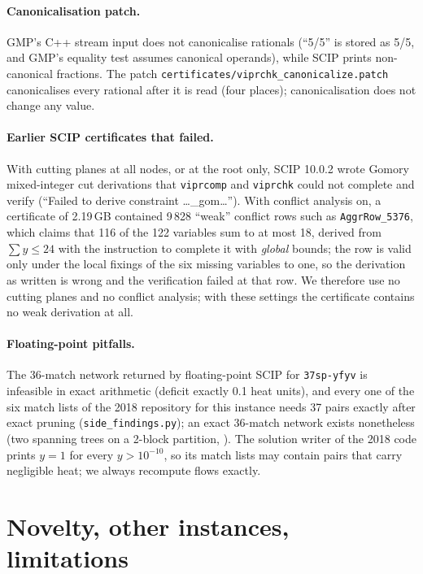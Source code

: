 \documentclass[11pt,a4paper]{report}
\newcommand*{\inst}[1]{\texttt{#1}}
\begin{document}
\paragraph{Canonicalisation patch.} GMP's C++ stream input does not canonicalise rationals (``5/5'' is stored as
5/5, and GMP's equality test assumes canonical operands), while SCIP prints non-canonical fractions. The patch
\texttt{certificates/viprchk\_canonicalize.patch} canonicalises every rational after it is read (four places);
canonicalisation does not change any value.

\paragraph{Earlier SCIP certificates that failed.} With cutting planes at all nodes, or at the root only, SCIP
10.0.2 wrote Gomory mixed-integer cut derivations that \texttt{viprcomp} and \texttt{viprchk} could not complete
and verify (``Failed to derive constraint \ldots{}\_gom\ldots''). With conflict analysis on, a certificate of 2.19\,GB
contained 9\,828 ``weak'' conflict rows such as \texttt{AggrRow\_5376}, which claims that 116 of the 122 variables
sum to at most 18, derived from $\sum y\le24$ with the instruction to complete it with \emph{global} bounds; the row is
valid only under the local fixings of the six missing variables to one, so the derivation as written is wrong and the
verification failed at that row. We therefore use no cutting planes and no conflict analysis; with these settings
the certificate contains no weak derivation at all.

\paragraph{Floating-point pitfalls.} The 36-match network returned by floating-point SCIP for \inst{37sp-yfyv} is
infeasible in exact arithmetic (deficit exactly 0.1 heat units), and every one of the six match lists of the 2018
repository for this instance needs 37 pairs exactly after exact pruning (\texttt{side\_findings.py}); an exact
36-match network exists nonetheless (two spanning trees on a 2-block partition, ). The solution
writer of the 2018 code prints $y=1$ for every $y>10^{-10}$, so its match lists may contain pairs that carry
negligible heat; we always recompute flows exactly.

\section{Novelty, other instances, limitations}
\end{document}
